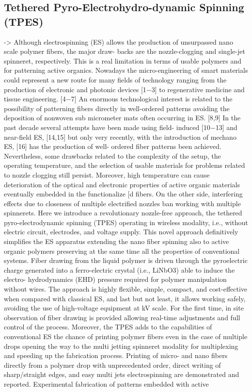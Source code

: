 \documentclass[5p,,preprint,12pt,twocolumn]{elsarticle}
\begin{document}
\subsection{Tethered Pyro-Electrohydro-dynamic Spinning (TPES) \unskip~\protect\cite{527120:11974307}}-{\textgreater} Although electrospinning (ES) allows the production of unsurpassed nano scale polymer fibers, the major draw- \mbox{}\protect\newline backs are the nozzle-clogging and single-jet spinneret, respectively. This is a real limitation in terms of usable polymers and for patterning active organics. Nowadays the micro-engineering of smart materials could represent a new route for many fields of technology ranging from the production of electronic and photonic devices [1\ensuremath{-}3] to regenerative medicine and tissue engineering. [4\ensuremath{-}7] An enormous technological interest is related to the possibility of patterning fibers directly in well-ordered patterns avoiding the deposition of nonwoven sub micrometer mats often occurring in ES. [8,9] In the past decade several attempts have been made using field- induced [10\ensuremath{-}13] and near-field ES, [14,15] but only very recently, with the introduction of mechano ES, [16] has the production of well- ordered fiber patterns been achieved. Nevertheless, some drawbacks related to the complexity of the setup, the operating temperature, and the selection of usable materials for problems related to nozzle clogging still persist. Moreover, high temperature can cause deterioration of the optical and electronic properties of active organic materials eventually embedded in the functionalize [d fibers. On the other side, interfering effects due to closeness of multiple electrified nozzles ban working with multiple spinnerets. Here we introduce a revolutionary nozzle-free approach, the tethered pyro-electrodynamic spinning (TPES) operating in wireless modality, i.e., without electric circuit, electrodes, and voltage supply. This novel approach definitively simplifies the ES apparatus extending the nano fiber spinning also to active organic polymers preserving at the same time all the properties of conventional systems. Fiber drawing from the liquid polymer is driven through the pyroelectric charge generated into a ferro-electric crystal (i.e., LiNbO3) able to induce the electro- hydrodynamics (EHD) pressure required for polymer manipulation without wires. The approach is highly flexible, simple, compact, and cost-effective when compared with classical ES, and last but not least, it allows working safely, avoiding the use of high-voltage equipment at kV scale. For the first time, in site observation of fiber drawing is provided allowing real-time adjustments and full control of the process. Moreover, the TPES adds to the capabilities of conventional ES the chance of printing polymer fibers even in the case of multiple drops opening the way to the multi jetting spinneret modality for multiplexing and speeding up the fabrication process. Printing of micro- and nano fibers directly from a polymer drop with unprecedented order, direct writing of sharp/straight edges, and easy multi jets electrospinning are demonstrated and reported. Experimental fabrication of patterns embedded with active 
\end{document}
